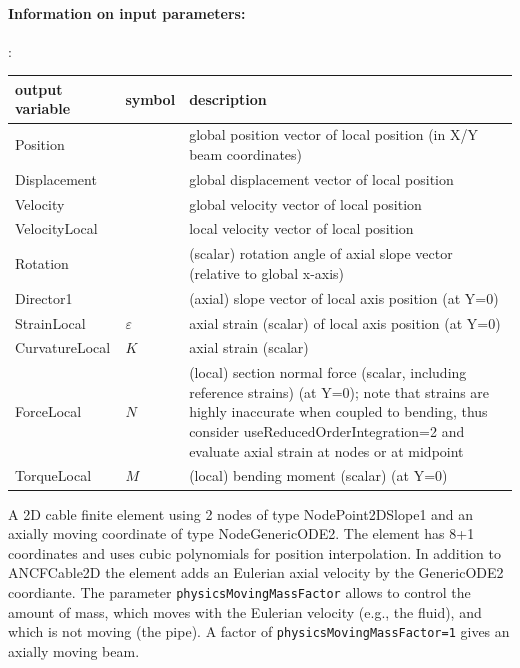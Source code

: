 \paragraph{Information on input parameters:} 
\finishTable

:
\begin{center}
\footnotesize
\begin{longtable}{| p{5cm} | p{5cm} | p{6cm} |} 
\hline
\bf output variable & \bf symbol & \bf description \\ \hline
Position &  & global position vector of local position (in X/Y beam coordinates)\\ \hline
Displacement &  & global displacement vector of local position\\ \hline
Velocity &  & global velocity vector of local position\\ \hline
VelocityLocal &  & local velocity vector of local position\\ \hline
Rotation &  & (scalar) rotation angle of axial slope vector (relative to global x-axis)\\ \hline
Director1 &  & (axial) slope vector of local axis position (at Y=0)\\ \hline
StrainLocal & $\varepsilon$ & axial strain (scalar) of local axis position (at Y=0)\\ \hline
CurvatureLocal & $K$ & axial strain (scalar)\\ \hline
ForceLocal & $N$ &  (local) section normal force (scalar, including reference strains) (at Y=0); note that strains are highly inaccurate when coupled to bending, thus consider useReducedOrderIntegration=2 and evaluate axial strain at nodes or at midpoint\\ \hline
TorqueLocal & $M$ &  (local) bending moment (scalar) (at Y=0)\\ \hline
\end{longtable}
\end{center}
 \noindent
    A 2D cable finite element using 2 nodes of type NodePoint2DSlope1 and an axially moving coordinate of type NodeGenericODE2.
    The element has 8+1 coordinates and uses cubic polynomials for position interpolation.
    In addition to ANCFCable2D the element adds an Eulerian axial velocity by the GenericODE2 coordiante.
    The parameter \texttt{physicsMovingMassFactor} allows to control the amount of mass, which moves with
    the Eulerian velocity (e.g., the fluid), and which is not moving (the pipe). 
    A factor of \texttt{physicsMovingMassFactor=1} gives an axially moving beam.

